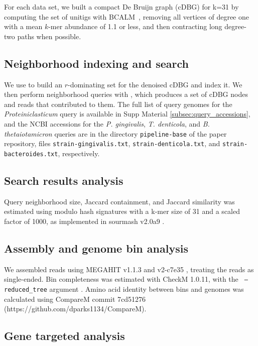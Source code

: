 For each data set, we built a compact De Bruijn graph (cDBG) for
k=31 by computing the set of unitigs with
BCALM~\cite{chikhi2016compacting}, removing all vertices of degree one
with a mean $k$-mer abundance of 1.1 or less, and then contracting
long degree-two paths when possible.

\subsection*{Neighborhood indexing and search}

We use \sgc to build an $r$-dominating set for the denoised cDBG and
index it. We then perform neighborhood queries with \sgc, which
produces a set of cDBG nodes and reads that contributed to them.  The
full list of query genomes for the {\em Proteiniclasticum} query is
  available in Supp Material \ref{subsec:query_accessions}, and
  the NCBI accessions for the {\em P. gingivalis}, {\em T. denticola}, and {\em B. thetaiotamicron} queries are in the directory {\tt pipeline-base} of the paper repository, files {\tt strain-gingivalis.txt}, {\tt strain-denticola.txt}, and {\tt strain-bacteroides.txt}, respectively.

\subsection*{Search results analysis}

Query neighborhood size, Jaccard containment, and Jaccard similarity
was estimated using modulo hash signatures with a k-mer size of 31 and
a scaled factor of 1000, as implemented in sourmash v2.0a9
\cite{sourmash}.

\subsection*{Assembly and genome bin analysis}

We assembled reads using MEGAHIT v1.1.3 \cite{megahit} and \plass
v2-c7e35 \cite{plass}, treating the reads as single-ended. Bin
completeness was estimated with CheckM 1.0.11, with the {\tt
  --reduced\_tree} argument \cite{CheckM}.  Amino acid identity
between bins and genomes was calculated using CompareM commit
7cd51276 (https://github.com/dparks1134/CompareM).

\subsection*{Gene targeted analysis}

